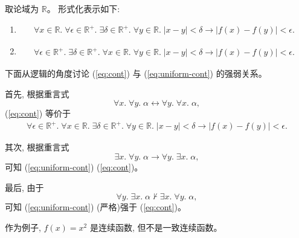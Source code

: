 \begin{solution}
  取论域为 $\mathbb{R}$。
	形式化表示如下:
  \setcounter{equation}{0}
  \begin{enumerate}[(1)]
    \item
      \begin{align}
        \forall x \in \mathbb{R}.\; \forall \epsilon \in \mathbb{R}^{+}.\;
          \exists \delta \in \mathbb{R}^{+}.\;
          \forall y \in \mathbb{R}.\; |x - y| < \delta \to |f(x) - f(y)| < \epsilon.
        \label{eq:cont}
      \end{align}
    \item
      \begin{align}
        \forall \epsilon \in \mathbb{R}^{+}.\; \exists \delta \in \mathbb{R}^{+}.\;
          \forall x \in \mathbb{R}.\; \forall y \in \mathbb{R}.\; |x - y| < \delta \to |f(x) - f(y)| < \epsilon.
        \label{eq:uniform-cont}
      \end{align}
  \end{enumerate}

  下面从逻辑的角度讨论 (\ref{eq:cont}) 与 (\ref{eq:uniform-cont}) 的强弱关系。

  首先, 根据重言式
  \[
    \forall x.\; \forall y.\; \alpha \leftrightarrow \forall y.\; \forall x.\; \alpha,
  \]
  (\ref{eq:cont}) 等价于
  \begin{align*}
    \forall \epsilon \in \mathbb{R}^{+}.\; \forall x \in \mathbb{R}.\;
      \exists \delta \in \mathbb{R}^{+}.\;
      \forall y \in \mathbb{R}.\; |x - y| < \delta \to |f(x) - f(y)| < \epsilon.
  \end{align*}

  其次, 根据重言式
  \[
    \exists x.\; \forall y.\; \alpha \to \forall y.\; \exists x.\; \alpha,
  \]
  可知 (\ref{eq:uniform-cont})  (\ref{eq:cont})。

  最后, 由于
  \[
    \forall y.\; \exists x.\; \alpha \nvdash \exists x.\; \forall y.\; \alpha,
  \]
  可知 (\ref{eq:uniform-cont}) (严格)强于 (\ref{eq:cont})。

  作为例子, $f(x) = x^{2}$ 是连续函数, 但不是一致连续函数。
\end{solution}